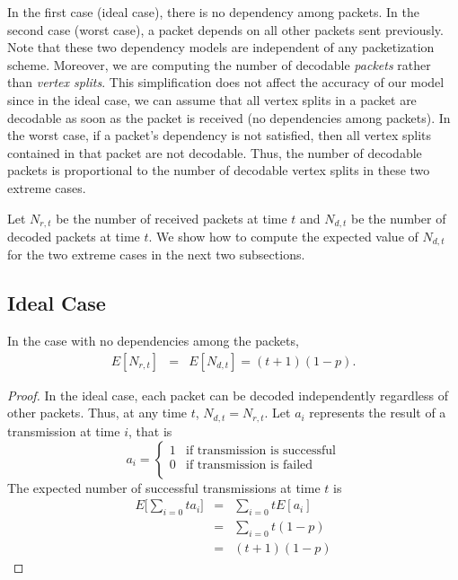     In the first case (ideal
    case), there is no dependency among packets.
    In the second case (worst case), a packet depends on all other packets
    sent previously.  Note that these two dependency models are
    independent of any packetization scheme.
    Moreover, we are computing the number of decodable \textit{packets} rather
    than \textit{vertex splits}.  This simplification does not affect
    the accuracy of our model
    since in the ideal case, we can assume that all vertex splits
    in a packet are decodable as soon as the packet is received (no dependencies
    among packets).  In the worst case, if a packet's dependency is not
    satisfied, then all vertex splits contained in that packet are
    not decodable.  Thus, the number of decodable packets is
    proportional to the number of decodable vertex splits in these two extreme
    cases.

    Let $N_{r,t}$ be the number of received packets at time $t$ and
    $N_{d,t}$ be the number of decoded packets at time $t$.   We show
    how to compute the expected value of $N_{d,t}$ for the two
    extreme cases in the next two subsections.

\subsection{Ideal Case}
\begin{theorem}
\label{t:model:ideal}
    In the case with no dependencies among the packets,
    \begin{eqnarray*}
    E[N_{r,t}] &=& E[N_{d,t}] = (t+1)(1-p).
    \end{eqnarray*}
\end{theorem}
    \begin{proof}
    In the ideal case, each packet can be decoded independently
    regardless of other packets.  Thus, at any time $t$,
    $N_{d,t} = N_{r,t}$.
    Let $a_i$ represents the result of a transmission at time $i$,  
    that is
    \begin{displaymath}
    a_i = \left\{\begin{array}{ll}
    1 & \textrm{if transmission is successful}\\
    0 & \textrm{if transmission is failed}\\
    \end{array}\right.
    \end{displaymath}
    The expected number of successful transmissions at time $t$ is
    \begin{eqnarray*}
    E\big[\sum_{i=0}{t}a_i\big] &=& \sum_{i=0}{t}E[a_i]\\
                                &=& \sum_{i=0}{t}(1-p)\\
                                &=& (t+1)(1-p)
    \end{eqnarray*}
    \end{proof}


